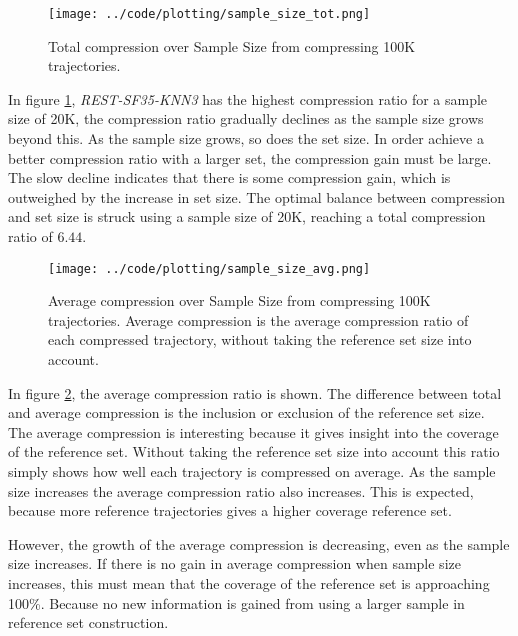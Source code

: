 \begin{figure}[h]
    \begin{minipage}{0.99\linewidth}
        \centering
        \texttt{[image: ../code/plotting/sample\_size\_tot.png]}
        \caption{Total compression over Sample Size from compressing 100K trajectories.}
        \label{fig:sample_tot}
    \end{minipage}
\end{figure}

In figure \ref{fig:sample_tot}, \textit{REST-SF35-KNN3} has the highest compression ratio for a sample size of 20K, the compression ratio gradually declines as the sample size grows beyond this. As the sample size grows, so does the set size. In order achieve a better compression ratio with a larger set, the compression gain must be large. The slow decline indicates that there is some compression gain, which is outweighed by the increase in set size. The optimal balance between compression and set size is struck using a sample size of 20K, reaching a total compression ratio of $6.44$.

\begin{figure}[h]
    \begin{minipage}{0.99\linewidth}
        \centering
        \texttt{[image: ../code/plotting/sample\_size\_avg.png]}
        \caption{Average compression over Sample Size from compressing 100K trajectories. Average compression is the average compression ratio of each compressed trajectory, without taking the reference set size into account.}
        \label{fig:sample_avg}
    \end{minipage}
\end{figure}

In figure \ref{fig:sample_avg}, the average compression ratio is shown. The difference between total and average compression is the inclusion or exclusion of the reference set size. The average compression is interesting because it gives insight into the coverage of the reference set. Without taking the reference set size into account this ratio simply shows how well each trajectory is compressed on average. As the sample size increases the average compression ratio also increases. This is expected, because more reference trajectories gives a higher coverage reference set.

However, the growth of the average compression is decreasing, even as the sample size increases. If there is no gain in average compression when sample size increases, this must mean that the coverage of the reference set is approaching 100\%. Because no new information is gained from using a larger sample in reference set construction.

